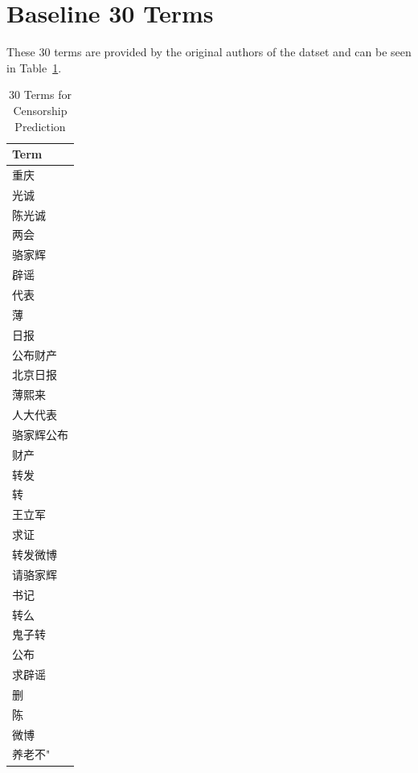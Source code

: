 \documentclass{sig-alternate-05-2015}
\begin{document}
\section{Baseline 30 Terms}
These 30 terms are provided by the original authors of the datset and can be seen in Table~\ref{tab:terms}\cite{Fu2013a}.
\begin{table}
  \centering
  \begin{tabular}{l}
    Term \\
    \hline
    重庆\\光诚\\陈光诚\\两会\\骆家辉\\辟谣\\代表\\薄\\日报\\公布财产\\北京日报\\薄熙来\\人大代表\\骆家辉公布\\财产\\转发\\转\\王立军\\求证\\转发微博\\请骆家辉\\书记\\转么\\鬼子转\\公布\\求辟谣\\删\\陈\\微博\\养老不"
  \end{tabular}
  \caption{30 Terms for Censorship Prediction}
  \label{tab:terms}
\end{table}
\end{document}
